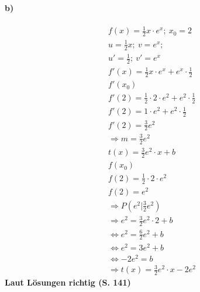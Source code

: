\documentclass[12pt,a4paper]{report}
\newcommand{\richtig}[1]{\color{ForestGreen}\textbf{
	Laut Lösungen richtig (S. #1)
}\color{black}}
\begin{document}
	\paragraph{b)}
	\begin{align*}
		f(x) = \frac{1}{2}x \cdot e^x;\ x_0 = 2\\
		u = \frac{1}{2}x;\ v = e^x; \\
		u' = \frac{1}{2};\ v' = e^x \\
		f'(x) = \frac{1}{2}x \cdot e^x + e^x \cdot \frac{1}{2} \\
		f'(x_0) \\
		f'(2) = \frac{1}{2} \cdot 2 \cdot e^2 + e^2 \cdot \frac{1}{2} \\
		f'(2) = 1 \cdot e^2 + e^2 \cdot \frac{1}{2} \\
		f'(2) = \frac{3}{2}e^2 \\
		\Rightarrow m = \frac{3}{2}e^2 \\
		t(x) = \frac{3}{2}e^2\cdot x + b \\
		f(x_0) \\
		f(2) = \frac{1}{2} \cdot 2 \cdot e^2 \\
		f(2) = e^2 \\
		\Rightarrow P(e^2|\frac{3}{2}e^2) \\
		\Rightarrow e^2 = \frac{3}{2}e^2 \cdot 2 + b \\
		\Leftrightarrow e^2 = \frac{6}{2}e^2 + b \\
		\Leftrightarrow e^2 = 3e^2 + b \\
		\Leftrightarrow -2e^2 = b \\
		\Rightarrow t(x) = \frac{3}{2}e^2\cdot x-2e^2
	\end{align*}
	\richtig{141}
	\newpage
\end{document}
